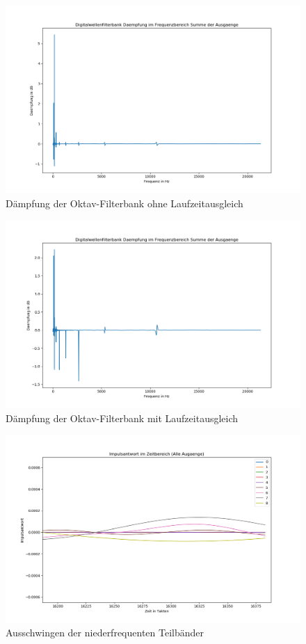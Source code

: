 \begin{figure}[h!]
	\centering	\includegraphics[width=14cm]{img/bank_freq_summe_keinAusgleich.png}
	\caption{Dämpfung der Oktav-Filterbank ohne Laufzeitausgleich}
	\label{fig:AusgangDeampfungohneAusgleich}
\end{figure}
\begin{figure}[h!]
	\centering	\includegraphics[width=14cm]{img/bank_freq_summe.png}
	\caption{Dämpfung der Oktav-Filterbank mit Laufzeitausgleich}
	\label{fig:AusgangDeampfung}
\end{figure}
\begin{figure}[h!]
	\centering	\includegraphics[width=14cm]{img/bank_zeit_alle_ausschwingen.png}
	\caption{Ausschwingen der niederfrequenten Teilbänder}
	\label{fig:Ausschwingen}
\end{figure}